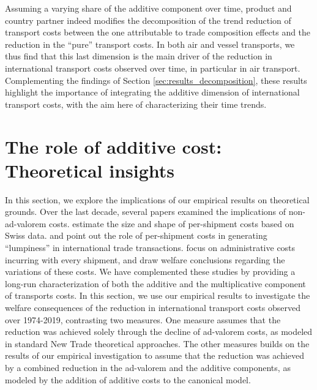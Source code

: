 \documentclass[a4paper,11pt]{article}
\begin{document}
Assuming a varying share of the additive component over time, product and country partner indeed modifies the decomposition of the trend reduction of transport costs between the one attributable to trade composition effects and the reduction in the ``pure'' transport costs.
In both air and vessel transports, we thus find that this last dimension is the main driver of the reduction in international transport costs observed over time, in particular in air transport.
Complementing the findings of Section \ref{sec:results_decomposition}, these results highlight the importance of integrating the additive dimension of international transport costs, with the aim here of characterizing their time trends.

\section{The role of additive cost: Theoretical insights}\label{sec:theory}


In this section, we explore the implications of our empirical results on theoretical grounds. Over the last decade, several papers examined the implications of non-ad-valorem costs. \cite{Kropf-Saure-JIE-2016} estimate the size and shape of per-shipment costs based on Swiss data. \cite{Alessandria-et-al-AER-2010} and \cite{Hornok-et-al-RES-2015} point out the role of per-shipment costs in generating ``lumpiness'' in international trade transactions. \cite{Hornok-et-al-JIE-2015} focus on administrative costs incurring with every shipment, and draw welfare conclusions regarding the variations of these costs. We have complemented these studies by providing a long-run characterization of both the additive and the multiplicative component of transports costs. In this section, we use our empirical results to investigate the welfare consequences of the reduction in international transport costs observed over 1974-2019, contrasting two measures. One measure assumes that the reduction was achieved solely through the decline of ad-valorem costs, as modeled in standard New Trade theoretical approaches. The other measures builds on the results of our empirical investigation to assume that the reduction was achieved by a combined reduction in the ad-valorem and the additive components, as modeled by the addition of additive costs to the canonical \citet{melitz} model.\smallskip
\end{document}

